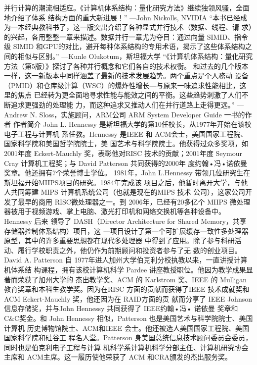 并行计算的潮流相适应。《计算机体系结构：量化研究方法》继续独领风骚，全面地介绍了体系
结构方面的重大新进展！”
—John Nickolls, NVIDIA
“本书已经成为一本经典教科书了，这一版突出介绍了各种显式并行技术（数据、线程、请
求）的兴起，各用整整一章来描述。数据并行一章尤为夺目：通过向量 SIMID、指令级 SIMID
和GPU的对比，避开每种体系结构的专用术语，揭示了这些体系结构之间的相似与区别。”
—Kunle Olukotum，斯坦福大学
“《计算机体系结构：量化研究方法（第5版）》探讨了各种并行概念和它们各自的技术权衡。
和过去的几个版本一样，这一新版本中同样涵盖了最新的技术发展趋势。两个重点是个人務动
设备（PMID）和仓库级计算（WSC）的爆炸性增长—与原来一味追求性能相比，这里的焦点
已经转为更全面地寻求性能与能效之间的平衡。这些趋势刺激了人们不断追求更强劲的处理能
力，而这种追求又推动人们在并行道路上走得更远。”
—Andrew N. Sloss，实施顾问，ARM公司
ARM System Developer Guide 一书的作者
作者简介
John L. Hennessy 是斯坦福大学的第10任校长，从1977年开始在该校电子工程与计算机
系任教。Hennessy 是IEEE 和 ACM会士，美国国家工程院、国家科学院和美国哲学院院士，美
国艺术与科学院院士。他获得过众多奖项，如2001年度 Eckert-Mauchly 奖，表彰他对RISC
技术的贡献；2001年度 Seymour Cray 计算机工程奖；与 David Patterson 共同获得的2000年
度约翰•冯•诺依曼奖章。他还拥有7个荣誉博士学位。
1981年，John L.Hennessy 带领几位研究生在斯坦福开始MIIPS项目的研究。1984年完成该
项目之后，他暂时离开大学，与他人共同筹建 MIPS 计算机系统公司（也就是现在的MIPS 技术
公司），这家公司开发了最早的商用 RISC微处理器之一。到 2006年，已经有20多亿个 MIIPS
微处理器被用于视频游戏、掌上电脑、激光打印机和网络交换机等各种设备中。Hennessy 后来
领导了 DASH（Director Architecture for Shared Memory，共享存储器控制体系结构）项目，这
一项目设计了第一个可扩展缓存一致性多处理器原型，其中的许多重要思想都在现代多处理器
中得到了应用。除了参与科研活动、履行学校职责之外，他仍作为前期顾问和投资者参与了无
数的创业项目。
David A. Patterson 自 1977年进人加州大学伯克利分校执教以来，一直讲授计算机体系结
构课程，拥有该校计算机科学 Pardee 讲座教授职位。他因为教学成果显著而荣获了加州大学的
杰出教学奖、ACM 的 Karlstrom 奖、IEEE 的 Mulligan教育奖章和本科生教学奖。因为在RISC
方面的贡献而获得了IEEE 技术成就奖和 ACM Eckert-Mauchly 奖，他还因为在 RAID方面的贡
献而分享了 IEEE Johnson 信息存储奖，并与John Hennessy 共同获得了 IEEE约翰•冯• 诺依曼
奖章和C&C奖金。和 John Hennessy 相似，Patterson 也是美国艺术与科学院院士、美国计算机
历史博物馆院士、ACM和IEEE 会士。他还被选人美国国家工程院、美国国家科学院和硅谷工
程名人堂。Patterson 身美国总统信息技术顾问委员会委员，同时也是伯克利电子工程与计算
机科学系计算机科学分部主任、计算机研究协会主席和 ACM主席。这一履历使他荣获了 ACM
和CRA颁发的杰出服务奖。
